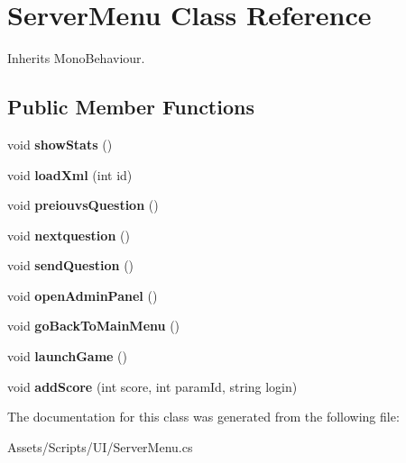 \hypertarget{class_server_menu}{\section{Server\-Menu Class Reference}
\label{class_server_menu}
}


Inherits Mono\-Behaviour.

\subsection*{Public Member Functions}
\begin{DoxyCompactItemize}
\item 
\hypertarget{class_server_menu_a03a56d9bd6998f96c8238aef907e23c1}{void {\bfseries show\-Stats} ()}\label{class_server_menu_a03a56d9bd6998f96c8238aef907e23c1}

\item 
\hypertarget{class_server_menu_a55e405994da557a7204bf8c673c8d693}{void {\bfseries load\-Xml} (int id)}\label{class_server_menu_a55e405994da557a7204bf8c673c8d693}

\item 
\hypertarget{class_server_menu_a35ee32a1132b70f9e9933e0d7ba8e401}{void {\bfseries preiouvs\-Question} ()}\label{class_server_menu_a35ee32a1132b70f9e9933e0d7ba8e401}

\item 
\hypertarget{class_server_menu_a2823c16ec7421708832ecd6fa7b55a37}{void {\bfseries nextquestion} ()}\label{class_server_menu_a2823c16ec7421708832ecd6fa7b55a37}

\item 
\hypertarget{class_server_menu_a69e36c91d028a12093b378f3b9f9ecfb}{void {\bfseries send\-Question} ()}\label{class_server_menu_a69e36c91d028a12093b378f3b9f9ecfb}

\item 
\hypertarget{class_server_menu_af8043a82820fd1ff27341020293fd189}{void {\bfseries open\-Admin\-Panel} ()}\label{class_server_menu_af8043a82820fd1ff27341020293fd189}

\item 
\hypertarget{class_server_menu_a94f9bf4ee526e8581da8dd037d9eb5a3}{void {\bfseries go\-Back\-To\-Main\-Menu} ()}\label{class_server_menu_a94f9bf4ee526e8581da8dd037d9eb5a3}

\item 
\hypertarget{class_server_menu_a24d2a979f00ed92333eb27ffeec5392c}{void {\bfseries launch\-Game} ()}\label{class_server_menu_a24d2a979f00ed92333eb27ffeec5392c}

\item 
\hypertarget{class_server_menu_a95e1a8db1a9fabf747876757d753f740}{void {\bfseries add\-Score} (int score, int param\-Id, string login)}\label{class_server_menu_a95e1a8db1a9fabf747876757d753f740}

\end{DoxyCompactItemize}


The documentation for this class was generated from the following file\-:\begin{DoxyCompactItemize}
\item 
Assets/\-Scripts/\-U\-I/Server\-Menu.\-cs\end{DoxyCompactItemize}
